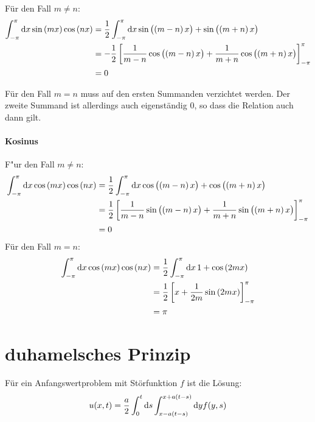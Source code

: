 \documentclass[11pt, ngerman, fleqn]{article}
\begin{document}
Für den Fall $m \neq n$:
{
	\renewcommand\d\dif
	\begin{align*}
		\int_{-\pi}^{\pi}\d x\sin\left(mx\right)\cos\left(nx\right)&=\frac 12\int_{-\pi}^{\pi}\d x\sin\left(\left(m-n\right)x\right)+\sin\left(\left(m+n\right)x\right)\\
															 &=-\frac 12 \left[\frac 1{m-n}\cos\left(\left(m-n\right)x\right)+\frac 1{m+n} \cos\left(\left(m+n\right)x\right) \right]_{-\pi}^{\pi}\\
				&=0
	\end{align*}
}

Für den Fall $m = n$ muss auf den ersten Summanden verzichtet werden. Der
zweite Summand ist allerdings auch eigenständig $0$, so dass die Relation auch
dann gilt.

\paragraph{Kosinus}
{
	\renewcommand\d\dif
	F"ur den Fall $m\neq n$:
	\begin{align*}
	\int_{-\pi}^{\pi}\d x\cos\left(mx\right)\cos\left(nx\right)&=\frac 12\int_{-\pi}^{\pi}\d x\cos\left(\left(m-n\right)x\right)+\cos\left(\left(m+n\right)x\right)\\
	&=\frac 12 \left[\frac 1{m-n}\sin\left(\left(m-n\right)x\right)+\frac 1{m+n} \sin\left(\left(m+n\right)x\right) \right]_{-\pi}^{\pi}\\
	&=0
	\end{align*}
Für den Fall $m=n$:
	\begin{align*}
	\int_{-\pi}^{\pi}\d x\cos\left(mx\right)\cos\left(nx\right)&=\frac 12\int_{-\pi}^{\pi}\d x \,1+\cos\left(2mx\right)\\
	&=\frac 12 \left[x+\frac 1{2m} \sin\left(2mx\right) \right]_{-\pi}^{\pi}\\
	&=\pi
	\end{align*}
}


\section{duhamelsches Prinzip}
\label{sec:2}

Für ein Anfangswertproblem mit Störfunktion $f$ ist die Lösung:
\[
	u(x, t) = \frac a2 \int_0^t \dif s \int_{x-a(t-s)}^{x+a(t-s)} \dif y f(y, s)
\]
\end{document}
